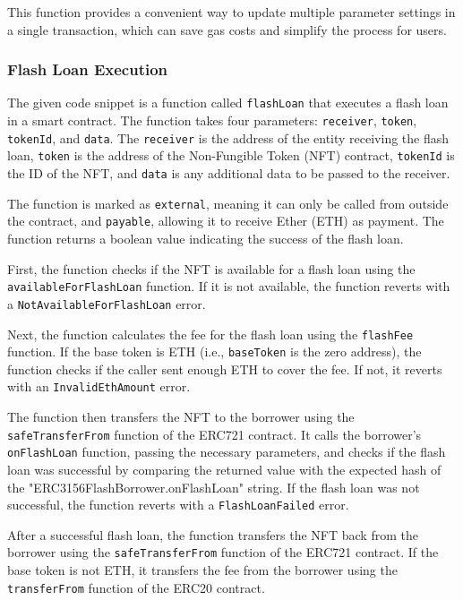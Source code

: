 This function provides a convenient way to update multiple parameter
settings in a single transaction, which can save gas costs and simplify
the process for users.

\hypertarget{flash-loan-execution}{%
\subsubsection{Flash Loan Execution}\label{flash-loan-execution}}

The given code snippet is a function called \texttt{flashLoan} that
executes a flash loan in a smart contract. The function takes four
parameters: \texttt{receiver}, \texttt{token}, \texttt{tokenId}, and
\texttt{data}. The \texttt{receiver} is the address of the entity
receiving the flash loan, \texttt{token} is the address of the
Non-Fungible Token (NFT) contract, \texttt{tokenId} is the ID of the
NFT, and \texttt{data} is any additional data to be passed to the
receiver.

The function is marked as \texttt{external}, meaning it can only be
called from outside the contract, and \texttt{payable}, allowing it to
receive Ether (ETH) as payment. The function returns a boolean value
indicating the success of the flash loan.

First, the function checks if the NFT is available for a flash loan
using the \texttt{availableForFlashLoan} function. If it is not
available, the function reverts with a \texttt{NotAvailableForFlashLoan}
error.

Next, the function calculates the fee for the flash loan using the
\texttt{flashFee} function. If the base token is ETH (i.e.,
\texttt{baseToken} is the zero address), the function checks if the
caller sent enough ETH to cover the fee. If not, it reverts with an
\texttt{InvalidEthAmount} error.

The function then transfers the NFT to the borrower using the
\texttt{safeTransferFrom} function of the ERC721 contract. It calls the
borrower's \texttt{onFlashLoan} function, passing the necessary
parameters, and checks if the flash loan was successful by comparing the
returned value with the expected hash of the
"ERC3156FlashBorrower.onFlashLoan" string. If the flash loan was not
successful, the function reverts with a \texttt{FlashLoanFailed} error.

After a successful flash loan, the function transfers the NFT back from
the borrower using the \texttt{safeTransferFrom} function of the ERC721
contract. If the base token is not ETH, it transfers the fee from the
borrower using the \texttt{transferFrom} function of the ERC20 contract.

